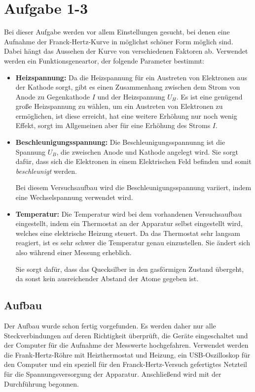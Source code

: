 \section{Aufgabe 1-3}
Bei dieser Aufgabe werden vor allem Einstellungen gesucht, bei denen eine Aufnahme der Franck-Hertz-Kurve in möglichst schöner Form möglich sind. Dabei hängt das Aussehen der Kurve von verschiedenen Faktoren ab. Verwendet werden ein Funktionsgeneartor, der folgende Parameter bestimmt:
\begin{itemize}
\item[] \textbf{Heizspannung:} Da die Heizspannung für ein Austreten von Elektronen aus der Kathode sorgt, gibt es einen Zusammenhang zwischen dem Strom von Anode zu Gegenkathode \(I\) und der Heizspannung \(U_H\). Es ist eine genügend große Heizspannung zu wählen, um ein Austreten von Elektronen zu ermöglichen, ist diese erreicht, hat eine weitere Erhöhung nur noch wenig Effekt, sorgt im Allgemeinen aber für eine Erhöhung des Stroms \(I\).
\item[] \textbf{Beschleunigungsspannung:} Die Beschleunigungsspannunng ist die Spannung \(U_B\), die zweischen Anode und Kathode angelegt wird. Sie sorgt dafür, dass sich die Elektronen in einem Elektrischen Feld befinden und somit \textit{beschleunigt} werden.

Bei diesem Versuchsaufbau wird die Beschleunigungsspannung variiert, indem eine Wechselspannung verwendet wird.

\item[] \textbf{Temperatur:} Die Temperatur wird bei dem vorhandenen Versuchsaufbau eingestellt, indem ein Thermostat an der Apparatur selbst eingestellt wird, welches eine elektrische Heizung steuert. Da das Thermostat sehr langsam reagiert, ist es sehr schwer die Temperatur genau einzustellen. Sie ändert sich also während einer Messung erheblich.

Sie sorgt dafür, dass das Quecksilber in den gasförmigen Zustand übergeht, da sonst kein ausreichender Abstand der Atome gegeben ist.
\end{itemize}
\subsection{Aufbau}
Der Aufbau wurde schon fertig vorgefunden. Es werden daher nur alle Steckverbindungen auf deren Richtigkeit überprüft, die Geräte eingeschaltet und der Computer für die Aufnahme der Messwerte hochgefahren. Verwendet werden die Frank-Hertz-Röhre mit Heizthermostat und Heizung, ein USB-Oszilloskop für den Computer und ein speziell für den Franck-Hertz-Versuch gefertigtes Netzteil für die Spannungsversorgung der Apparatur. Anschließend wird mit der Durchführung begonnen.
